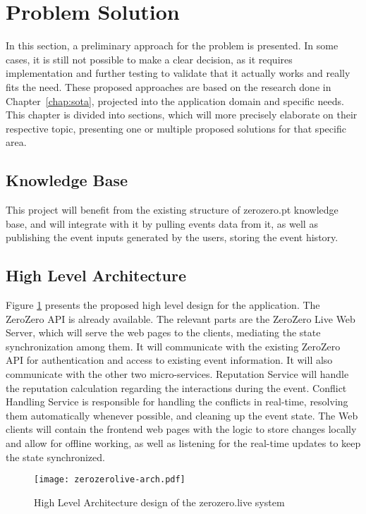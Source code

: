 \section{Problem Solution}\label{sec:prob-sol}

In this section, a preliminary approach for the problem is presented. In some cases, it is still not possible to make a clear decision, as it requires implementation and further testing to validate that it actually works and really fits the need. These proposed approaches are based on the research done in Chapter~\ref{chap:sota}, projected into the application domain and specific needs. This chapter is divided into sections, which will more precisely elaborate on their respective topic, presenting one or multiple proposed solutions for that specific area. 

\subsection{Knowledge Base}
This project will benefit from the existing structure of zerozero.pt knowledge base, and will integrate with it by pulling events data from it, as well as publishing the event inputs generated by the users, storing the event history.

\subsection{High Level Architecture}

Figure \ref{fig:high-level-arch} presents the proposed high level design for the application. The ZeroZero API is already available. The relevant parts are the ZeroZero Live Web Server, which will serve the web pages to the clients, mediating the state synchronization among them. It will communicate with the existing ZeroZero API for authentication and access to existing event information. It will also communicate with the other two micro-services. Reputation Service will handle the reputation calculation regarding the interactions during the event. Conflict Handling Service is responsible for handling the conflicts in real-time, resolving them automatically whenever possible, and cleaning up the event state. The Web clients will contain the frontend web pages with the logic to store changes locally and allow for offline working, as well as listening for the real-time updates to keep the state synchronized.

\begin{figure}[t]
    \begin{center}
        \leavevmode
        \texttt{[image: zerozerolive-arch.pdf]}
        \caption{High Level Architecture design of the zerozero.live system}
        \label{fig:high-level-arch}
    \end{center}
\end{figure}

